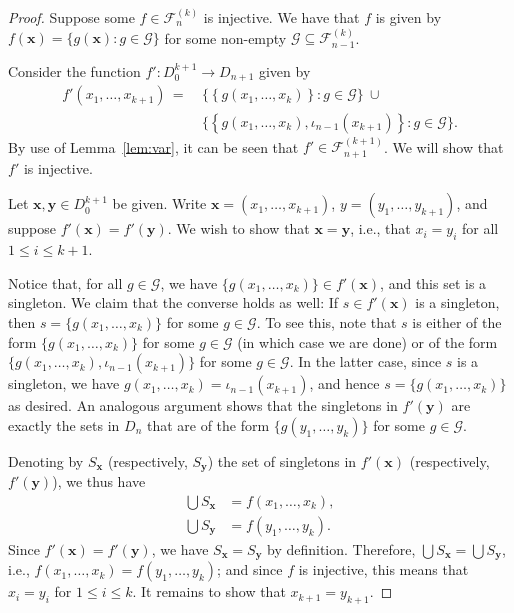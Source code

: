\documentclass[10pt,a4paper]{amsart}
\newcommand{\fset}[2]{\mathcal F^{(#1)}_{#2}}
\begin{document}
\begin{proof}
    Suppose some $f \in \fset kn$ is injective. We have that $f$ is given by $f(\mathbf x) = \{g(\mathbf x) : g \in \mathcal G\}$ for some non-empty $\mathcal G \subseteq \fset k{n-1}$.

    Consider the function $f' : D_0^{k+1} \to D_{n+1}$ given by
    \begin{align*}
        f'(x_1, \dots, x_{k+1})\,=\ &\big\{\left\{g(x_1, \dots, x_k)\right\} : g \in \mathcal G\big\}\ \cup\\
        &\big\{\left\{g(x_1, \dots, x_k), \iota_{n-1}(x_{k+1})\right\} : g \in \mathcal G \big\}.
    \end{align*}
    By use of Lemma~\ref{lem:var}, it can be seen that $f' \in \fset {k+1}{n+1}$. We will show that $f'$ is injective.

    Let $\mathbf x, \mathbf y \in D_0^{k+1}$ be given. Write $\mathbf x = (x_1, \dots, x_{k+1})$, $y = (y_1, \dots, y_{k+1})$, and suppose $f'(\mathbf x) = f'(\mathbf y)$. We wish to show that $\mathbf x = \mathbf y$, i.e., that $x_i = y_i$ for all $1 \leq i \leq k+1$.

    Notice that, for all $g \in \mathcal G$, we have $\{g(x_1, \dots, x_k)\} \in f'(\mathbf x)$, and this set is a singleton. We claim that the converse holds as well: If $s \in f'(\mathbf x)$ is a singleton, then $s = \{g(x_1, \dots, x_k)\}$ for some $g \in \mathcal G$. To see this, note that $s$ is either of the form $\{g(x_1, \dots, x_k)\}$ for some $g \in \mathcal G$ (in which case we are done) or of the form $\{g(x_1, \dots, x_k), \iota_{n-1}(x_{k+1})\}$ for some $g \in \mathcal G$. In the latter case, since $s$ is a singleton, we have $g(x_1, \dots, x_k) = \iota_{n-1}(x_{k+1})$, and hence $s = \{g(x_1, \dots, x_k)\}$ as desired. An analogous argument shows that the singletons in $f'(\mathbf y)$ are exactly the sets in $D_n$ that are of the form $\{g(y_1, \dots, y_k)\}$ for some $g \in \mathcal G$.

    Denoting by $S_{\mathbf x}$ (respectively, $S_{\mathbf y}$) the set of singletons in $f'(\mathbf x)$ (respectively, $f'(\mathbf y)$), we thus have
    \begin{align*}
        \bigcup S_{\mathbf x} &= f(x_1, \dots, x_k),\\
        \bigcup S_{\mathbf y} &= f(y_1, \dots, y_k).
    \end{align*}
    Since $f'(\mathbf x) = f'(\mathbf y)$, we have $S_{\mathbf x} = S_{\mathbf y}$ by definition. Therefore, $\bigcup S_{\mathbf x} = \bigcup S_{\mathbf y}$, i.e., $f(x_1, \dots, x_k) = f(y_1, \dots, y_k)$; and since $f$ is injective, this means that $x_i = y_i$ for $1 \leq i \leq k$. It remains to show that $x_{k+1} = y_{k+1}$.


\end{proof}
\end{document}
